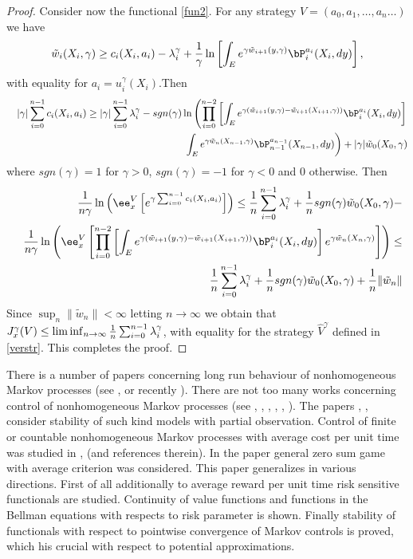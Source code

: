 \documentclass[10pt,english]{extarticle}
\begin{document}
\begin{proof}
Consider now the functional \eqref{fun2}. For any strategy $V=(a_0,a_1,\ldots, a_n\ldots)$ we have 
\begin{equation}\label{Bel2}
\tilde{w}_i(X_i,\gamma)\geq c_i(X_i,a_i)-\lambda_i^\gamma+  {1\over \gamma}\ln\left[ \int_E e^{\gamma \tilde{w}_{i+1}(y,\gamma)}\bP_i^{a_i}(X_i,dy)\right],
\end{equation}
with equality for $a_i=u_i^\gamma(X_i)$.Then
\begin{eqnarray}
&& |\gamma| \sum_{i=0}^{n-1} c_i(X_i,a_i) \geq  |\gamma|\sum_{i=0}^{n-1}\lambda_i^\gamma - sgn(\gamma)\ln \left(\prod_{i=0}^{n-2}\left[\int_E e^{\gamma(\tilde{w}_{i+1}(y,\gamma)-\tilde{w}_{i+1}(X_{i+1},\gamma))}\bP_i^{a_i}(X_i,dy)\right] \right.  \nonumber \\
&&\left. \int_E e^{\gamma \tilde{w}_n(X_{n-1},\gamma)} \bP_{n-1}^{a_{n-1}}(X_{n-1},dy)\right)+|\gamma|\tilde{w}_0(X_0,\gamma)
\end{eqnarray}
where $sgn(\gamma)=1 $ for $\gamma>0$, $sgn(\gamma)=-1$ for $\gamma<0$ and $0$ otherwise.
Then
\begin{eqnarray}\label{verbel2}
&&{1\over n \gamma} \ln \left(\ee_x^V\left[e^{\gamma\sum_{i=0}^{n-1} c_i(X_i,a_i)}\right]\right)\leq  {1\over n} \sum_{i=0}^{n-1} \lambda_i^\gamma + {1\over n}sgn(\gamma) \tilde{w}_0(X_0,\gamma) - \nonumber \\
&&{1\over n \gamma}\ln \left( \ee_x^V \left[\prod_{i=0}^{n-2}\left[\int_E e^{\gamma(\tilde{w}_{i+1}(y,\gamma)-\tilde{w}_{i+1}(X_{i+1},\gamma))}\bP_i^{a_i}(X_i,dy)\right] e^{\gamma\tilde{w}_n(X_{n},\gamma)}\right]\right)\leq \nonumber \\
&& {1\over n} \sum_{i=0}^{n-1} \lambda_i^\gamma + {1\over n}sgn(\gamma) \tilde{w}_0(X_0,\gamma) +{1\over n} \|\tilde{w}_n\|   
\end{eqnarray}
Since $\sup_n \|\tilde{w}_n\|<\infty$ letting $n\to \infty$ we obtain that $J_x^\gamma(V)\leq \liminf_{n\to \infty} {1\over n} \sum_{i=0}^{n-1} \lambda_i^\gamma$, with equality for the strategy $\hat{V}^\gamma$ defined in \eqref{verstr}. 
This completes the proof.
\end{proof}

There is a number of papers concerning long run behaviour of nonhomogeneous Markov processes (see \cite{Dob}, \cite{Ios} or recently \cite{LiuLu}).  
There are not too many works concerning control of nonhomogeneous Markov processes (see \cite{Park}, \cite{Cao}, \cite{Zheng}, \cite{Ding}, \cite{Ngoc}, \cite{Bao}). The papers \cite{Ding}, \cite{Ngoc}, \cite{Bao} consider stability of such kind models with partial observation. Control of finite or countable nonhomogeneous Markov processes with average cost per unit time was studied in \cite{Park}, \cite{Cao} (and references therein). In the paper  \cite{Zheng} general zero sum game with average criterion was considered. This paper generalizes \cite{Zheng} in various directions. First of all additionally to average reward per unit time risk sensitive functionals are studied. Continuity of value functions and functions in the Bellman equations with respects to risk parameter is shown. Finally stability of functionals with respect to pointwise convergence of Markov controls is proved, which his crucial with respect to potential approximations. 
\end{document}
